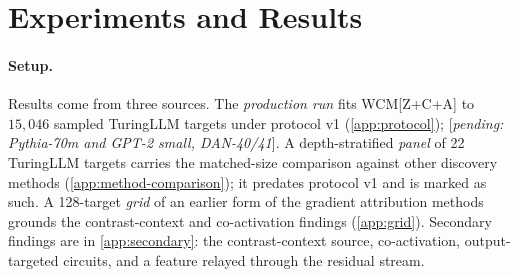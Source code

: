 \documentclass[10pt]{article}
\newcommand{\pending}[1]{\textcolor{red!70!black}{[\textit{pending: #1}]}}
\begin{document}
\section{Experiments and Results}
\label{sec:results}


\paragraph{Setup.}
Results come from three sources.
The \emph{production run} fits WCM[Z+C+A] to $15{,}046$ sampled TuringLLM targets under protocol v1 (\cref{app:protocol}); \pending{Pythia-70m and GPT-2 small, DAN-40/41}.
A depth-stratified \emph{panel} of 22 TuringLLM targets carries the matched-size comparison against other discovery methods (\cref{app:method-comparison}); it predates protocol v1 and is marked as such.
A 128-target \emph{grid} of an earlier form of the gradient attribution methods grounds the contrast-context and co-activation findings (\cref{app:grid}).
Secondary findings are in \cref{app:secondary}: the contrast-context source, co-activation, output-targeted circuits, and a feature relayed through the residual stream.
\end{document}
